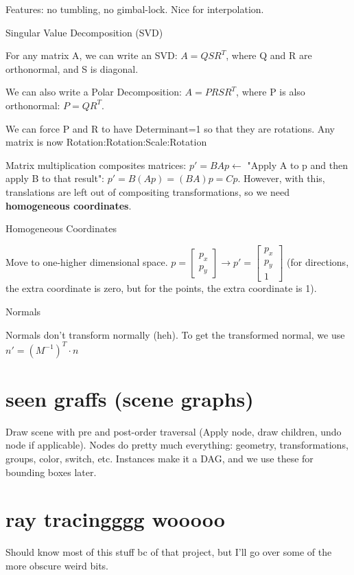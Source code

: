 \documentclass{article}
\begin{document}
Features: no tumbling, no gimbal-lock. Nice for interpolation.

\vspace{10pt}
Singular Value Decomposition (SVD)

For any matrix A, we can write an SVD: $A=QSR^T$, where Q and R are orthonormal, and S is diagonal.

We can also write a Polar Decomposition: $A=PRSR^T$, where P is also orthonormal: $P=QR^T$.

We can force P and R to have Determinant=1 so that they are rotations. Any matrix is now Rotation:Rotation:Scale:Rotation

Matrix multiplication composites matrices: $p'=BAp \leftarrow $ "Apply A to p and then apply B to that result": $p'=B(Ap)=(BA)p=Cp$. However, with this, translations are left out of compositing transformations, so we need {\bf homogeneous coordinates}.

\vspace{10pt}
Homogeneous Coordinates

Move to one-higher dimensional space. $p=\begin{bmatrix} p_x \\ p_y \end{bmatrix} \rightarrow p'=\begin{bmatrix} p_x \\ p_y \\ 1 \end{bmatrix} $ (for directions, the extra coordinate is zero, but for the points, the extra coordinate is 1).

\vspace{10pt}
Normals

Normals don't transform normally (heh). To get the transformed normal, we use $n' = (M^{-1})^T\cdot n$
\section{seen graffs (scene graphs)} %
\label{sec:seen_graffs_scene_graphs_}
Draw scene with pre and post-order traversal (Apply node, draw children, undo node if applicable). Nodes do pretty much everything: geometry, transformations, groups, color, switch, etc. Instances make it a DAG, and we use these for bounding boxes later.

\section{ray tracingggg wooooo} %
\label{sec:ray_tracingggg_wooooo}
Should know most of this stuff bc of that project, but I'll go over some of the more obscure weird bits.
\end{document}
